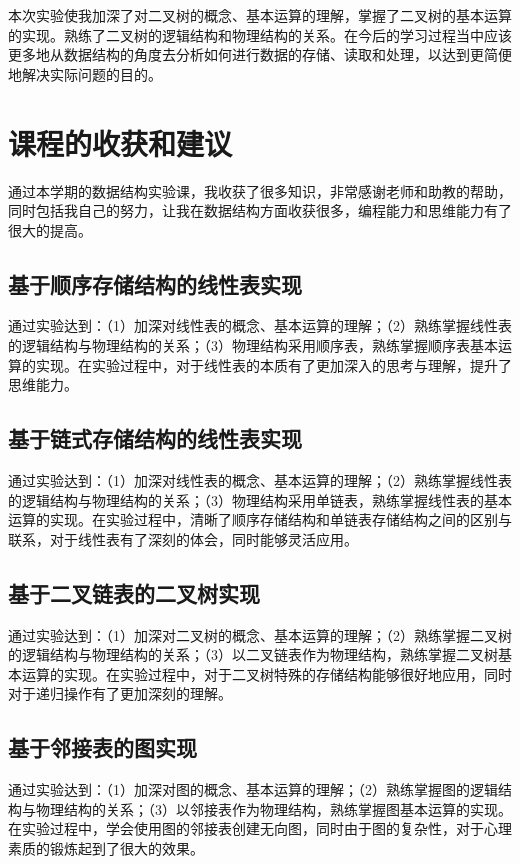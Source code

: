 \documentclass[supercite]{Experimental_Report}
\theoremstyle{definition}
\begin{document}
本次实验使我加深了对二叉树的概念、基本运算的理解，掌握了二叉树的基本运算的实现。熟练了二叉树的逻辑结构和物理结构的关系。在今后的学习过程当中应该更多地从数据结构的角度去分析如何进行数据的存储、读取和处理，以达到更简便地解决实际问题的目的。


\newpage

\section{课程的收获和建议}

通过本学期的数据结构实验课，我收获了很多知识，非常感谢老师和助教的帮助，同时包括我自己的努力，让我在数据结构方面收获很多，编程能力和思维能力有了很大的提高。

\subsection{基于顺序存储结构的线性表实现}

通过实验达到：（1）加深对线性表的概念、基本运算的理解；（2）熟练掌握线性表的逻辑结构与物理结构的关系；（3）物理结构采用顺序表，熟练掌握顺序表基本运算的实现。在实验过程中，对于线性表的本质有了更加深入的思考与理解，提升了思维能力。

\subsection{基于链式存储结构的线性表实现}

通过实验达到：（1）加深对线性表的概念、基本运算的理解；（2）熟练掌握线性表的逻辑结构与物理结构的关系；（3）物理结构采用单链表，熟练掌握线性表的基本运算的实现。在实验过程中，清晰了顺序存储结构和单链表存储结构之间的区别与联系，对于线性表有了深刻的体会，同时能够灵活应用。

\subsection{基于二叉链表的二叉树实现}

通过实验达到：（1）加深对二叉树的概念、基本运算的理解；（2）熟练掌握二叉树的逻辑结构与物理结构的关系；（3）以二叉链表作为物理结构，熟练掌握二叉树基本运算的实现。在实验过程中，对于二叉树特殊的存储结构能够很好地应用，同时对于递归操作有了更加深刻的理解。

\subsection{基于邻接表的图实现}

通过实验达到：（1）加深对图的概念、基本运算的理解；（2）熟练掌握图的逻辑结构与物理结构的关系；（3）以邻接表作为物理结构，熟练掌握图基本运算的实现。在实验过程中，学会使用图的邻接表创建无向图，同时由于图的复杂性，对于心理素质的锻炼起到了很大的效果。
\end{document}
